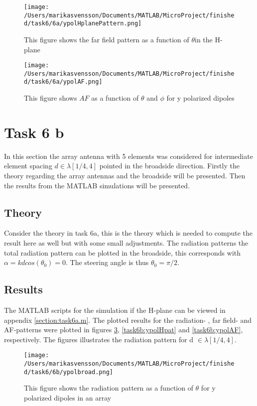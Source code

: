 \begin{figure}[h]
\centering
\texttt{[image: /Users/marikasvensson/Documents/MATLAB/MicroProject/finished/task6/6a/ypolHplanePattern.png]}
\caption{This figure shows the far field pattern as a function of $\theta$in the H-plane}
\label{task6a:ypolHpat}
\end{figure}

\begin{figure}[h]
\centering
\texttt{[image: /Users/marikasvensson/Documents/MATLAB/MicroProject/finished/task6/6a/ypolAF.png]}
\caption{This figure shows $AF$ as a function of $\theta$ and $\phi$ for y polarized dipoles}
\label{task6a:ypolAF}
\end{figure}
\FloatBarrier

\section{Task 6 b}
In this section the array antenna with 5 elements was considered for intermediate element spacing $d \in \lambda[1/4,4]$ pointed in the broadside direction. Firstly the theory regarding the array antennas and the broadside will be presented. Then the results from the MATLAB simulations will be presented. 
\subsection{Theory}
Consider the theory in task 6a, this is  the theory which is needed to compute the  result here as well but with some small adjustments. 
The radiation patterns the total radiation pattern can be plotted in the broadside, this corresponds with $\alpha = kdcos(\theta_0) = 0 $. The steering angle is thus $\theta_0 = \pi/2$. \cite{kildal2000foundations}

\subsection{Results}
The MATLAB scripts for the simulation if the H-plane can be viewed in appendix \ref{section:task6a.m}. The plotted results for  the radiation- , far field- and AF-patterns were plotted in figures \ref{task6b:ypol}, \ref{task6b:ypolHpat} and \ref{task6b:ypolAF}, respectively. The figures illustrates the radiation pattern for d $\in \lambda[1/4, 4].$ 

\begin{figure}[h]
\centering
\texttt{[image: /Users/marikasvensson/Documents/MATLAB/MicroProject/finished/task6/6b/ypolbroad.png]}
\caption{This figure shows the radiation pattern as a function of $\theta$ for y polarized dipoles in an array}
\label{task6b:ypol}
\end{figure}

